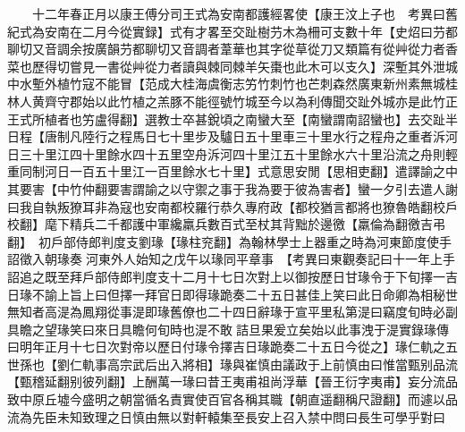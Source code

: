 　　十二年春正月以康王傅分司王式為安南都護經畧使【康王汶上子也　考異曰舊紀式為安南在二月今從實録】式有才畧至交趾樹芀木為柵可支數十年【史炤曰芀都聊切又音調余按廣韻芀都聊切又音調者葦華也其字從草從刀又類篇有從艸從力者香菜也歷得切嘗見一書從艸從力者讀與棘同棘羊矢棗也此木可以支久】深塹其外泄城中水塹外植竹寇不能冒【范成大桂海虞衡志竻竹刺竹也芒刺森然廣東新州素無城桂林人黄齊守郡始以此竹植之羔豚不能徑號竹城至今以為利傳聞交趾外城亦是此竹正王式所植者也竻盧得翻】選教士卒甚銳頃之南蠻大至【南蠻謂南詔蠻也】去交趾半日程【唐制凡陸行之程馬日七十里步及驢日五十里車三十里水行之程舟之重者泝河日三十里江四十里餘水四十五里空舟泝河四十里江五十里餘水六十里沿流之舟則輕重同制河日一百五十里江一百里餘水七十里】式意思安閒【思相吏翻】遣譯諭之中其要害【中竹仲翻要害謂諭之以守禦之事于我為要于彼為害者】蠻一夕引去遣人謝曰我自執叛獠耳非為寇也安南都校羅行恭久專府政【都校猶言都將也獠魯皓翻校戶校翻】麾下精兵二千都護中軍纔羸兵數百式至杖其背黜於邊徼【羸倫為翻徼吉弔翻】　初戶部侍郎判度支劉瑑【瑑柱兖翻】為翰林學士上器重之時為河東節度使手詔徵入朝瑑奏河東外人始知之戊午以瑑同平章事　【考異曰東觀奏記曰十一年上手詔追之既至拜戶部侍郎判度支十二月十七日次對上以御按歷日甘瑑令于下旬擇一吉日瑑不諭上旨上曰但擇一拜官日即得瑑跪奏二十五日甚佳上笑曰此日命卿為相秘世無知者高湜為鳳翔從事湜即瑑舊僚也二十四日辭瑑于宣平里私第湜曰竊度旬時必副具瞻之望瑑笑曰來日具瞻何旬時也湜不敢詰旦果爰立矣始以此事洩于湜實錄瑑傳曰明年正月十七日次對帝以歷日付瑑令擇吉日瑑跪奏二十五日今從之】瑑仁軌之五世孫也【劉仁軌事高宗武后出入將相】瑑與崔慎由議政于上前慎由曰惟當甄别品流【甄稽延翻别彼列翻】上酬萬一瑑曰昔王夷甫祖尚浮華【晉王衍字夷甫】妄分流品致中原丘墟今盛明之朝當循名責實使百官各稱其職【朝直遥翻稱尺證翻】而遽以品流為先臣未知致理之日慎由無以對軒轅集至長安上召入禁中問曰長生可學乎對曰

